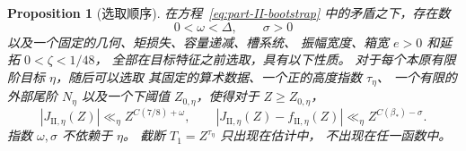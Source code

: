 \documentclass[11pt,a4paper]{article}
\numberwithin{equation}{section}
\numberwithin{figure}{section}
\newtheorem{proposition}[theorem]{Proposition}
\theoremstyle{definition}
\theoremstyle{remark}
\begin{document}
\begin{proposition}[选取顺序]\label{prop:parameter-order}
在方程~\eqref{eq:part-II-bootstrap} 中的矛盾之下，存在数
\[
 0<\omega<\Delta,\qquad \sigma>0
\]
以及一个固定的几何、矩损失、容量递减、槽系统、
振幅宽度、箱宽 \(e>0\) 和延拓 \(0<\zeta<1/48\)，
全部在目标特征之前选取，具有以下性质。
对于每个本原有限阶目标 \(\eta\)，随后可以选取
其固定的算术数据、一个正的高度指数 \(\tau_\eta\)、
一个有限的外部尾阶 \(N_\eta\) 以及一个下阈值
\(Z_{0,\eta}\)，使得对于 \(Z\ge Z_{0,\eta}\)，
\[
 |J_{\mathrm{II},\eta}(Z)|\ll_\eta Z^{C(7/8)+\omega},\qquad
 |J_{\mathrm{II},\eta}(Z)-f_{\mathrm{II},\eta}(Z)|
 \ll_\eta Z^{C(\beta_*)-\sigma}.
\]
指数 \(\omega,\sigma\) 不依赖于 \(\eta\)。
截断 \(T_1=Z^{\tau_\eta}\) 只出现在估计中，
不出现在任一函数中。
\end{proposition}
\end{document}

